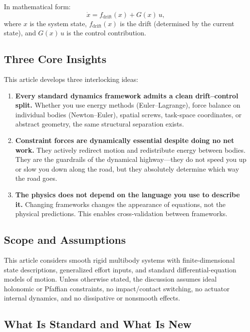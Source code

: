 \documentclass[11pt]{article}
\begin{document}
In mathematical form:
\begin{equation}\label{eq:affine-master}
\dot{x} = f_{\mathrm{drift}}(x) + G(x)\,u,
\end{equation}
where $x$ is the system state, $f_{\mathrm{drift}}(x)$ is the drift (determined by the current state), and $G(x)\,u$ is the control contribution.

\subsection{Three Core Insights}

This article develops three interlocking ideas:

\begin{enumerate}
\item \textbf{Every standard dynamics framework admits a clean drift--control split.} Whether you use energy methods (Euler--Lagrange), force balance on individual bodies (Newton--Euler), spatial screws, task-space coordinates, or abstract geometry, the same structural separation exists.

\item \textbf{Constraint forces are dynamically essential despite doing no net work.} They actively redirect motion and redistribute energy between bodies. They are the guardrails of the dynamical highway---they do not speed you up or slow you down along the road, but they absolutely determine which way the road goes.

\item \textbf{The physics does not depend on the language you use to describe it.} Changing frameworks changes the appearance of equations, not the physical predictions. This enables cross-validation between frameworks.
\end{enumerate}

\subsection{Scope and Assumptions}

This article considers smooth rigid multibody systems with finite-dimensional state descriptions, generalized effort inputs, and standard differential-equation models of motion. Unless otherwise stated, the discussion assumes ideal holonomic or Pfaffian constraints, no impact/contact switching, no actuator internal dynamics, and no dissipative or nonsmooth effects.

\subsection{What Is Standard and What Is New}
\end{document}
